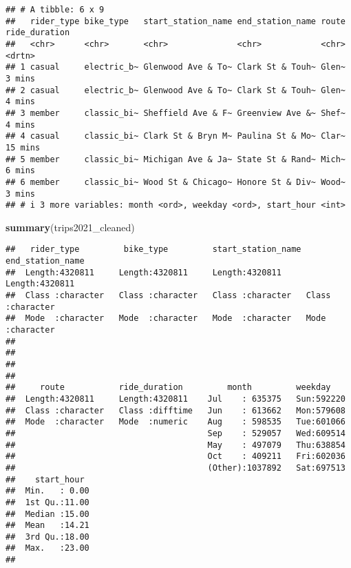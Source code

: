 \documentclass[
]{article}
\newenvironment{Shaded}{\begin{snugshade}}{\end{snugshade}}
\newcommand{\FunctionTok}[1]{\textcolor[rgb]{0.13,0.29,0.53}{\textbf{#1}}}
\newcommand{\NormalTok}[1]{#1}
\begin{document}
\begin{verbatim}
## # A tibble: 6 x 9
##   rider_type bike_type   start_station_name end_station_name route ride_duration
##   <chr>      <chr>       <chr>              <chr>            <chr> <drtn>       
## 1 casual     electric_b~ Glenwood Ave & To~ Clark St & Touh~ Glen~  3 mins      
## 2 casual     electric_b~ Glenwood Ave & To~ Clark St & Touh~ Glen~  4 mins      
## 3 member     classic_bi~ Sheffield Ave & F~ Greenview Ave &~ Shef~  4 mins      
## 4 casual     classic_bi~ Clark St & Bryn M~ Paulina St & Mo~ Clar~ 15 mins      
## 5 member     classic_bi~ Michigan Ave & Ja~ State St & Rand~ Mich~  6 mins      
## 6 member     classic_bi~ Wood St & Chicago~ Honore St & Div~ Wood~  3 mins      
## # i 3 more variables: month <ord>, weekday <ord>, start_hour <int>
\end{verbatim}

\begin{Shaded}
\begin{Highlighting}[]
\FunctionTok{summary}\NormalTok{(trips2021\_cleaned)}
\end{Highlighting}
\end{Shaded}

\begin{verbatim}
##   rider_type         bike_type         start_station_name end_station_name  
##  Length:4320811     Length:4320811     Length:4320811     Length:4320811    
##  Class :character   Class :character   Class :character   Class :character  
##  Mode  :character   Mode  :character   Mode  :character   Mode  :character  
##                                                                             
##                                                                             
##                                                                             
##                                                                             
##     route           ride_duration         month         weekday     
##  Length:4320811     Length:4320811    Jul    : 635375   Sun:592220  
##  Class :character   Class :difftime   Jun    : 613662   Mon:579608  
##  Mode  :character   Mode  :numeric    Aug    : 598535   Tue:601066  
##                                       Sep    : 529057   Wed:609514  
##                                       May    : 497079   Thu:638854  
##                                       Oct    : 409211   Fri:602036  
##                                       (Other):1037892   Sat:697513  
##    start_hour   
##  Min.   : 0.00  
##  1st Qu.:11.00  
##  Median :15.00  
##  Mean   :14.21  
##  3rd Qu.:18.00  
##  Max.   :23.00  
## 
\end{verbatim}
\end{document}
